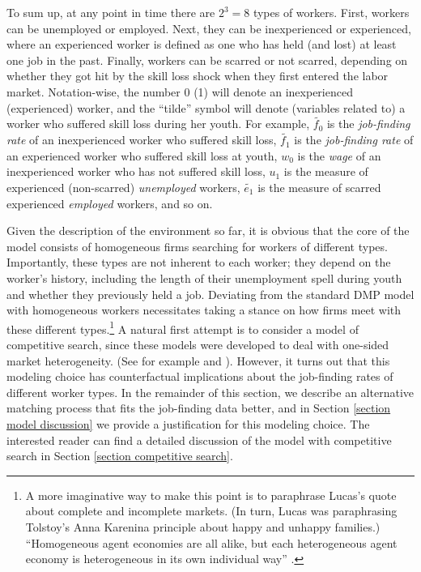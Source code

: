 \documentclass[12pt]{article} %
\theoremstyle{definition}
\begin{document}
To sum up, at any point in time there are $2^3=8$ types of workers. First, workers can be unemployed or employed. Next, they can be inexperienced or experienced, where an experienced worker is defined as one who has held (and lost) at least one job in the past. Finally, workers can be scarred or not scarred, depending on whether they got hit by the skill loss shock when they first entered the labor market. Notation-wise, the number 0 (1) will denote an inexperienced (experienced) worker, and the ``tilde'' symbol will denote (variables related to) a worker who suffered skill loss during her youth. %
For example, $\tilde{f_0}$ is the \textit{job-finding rate} of an inexperienced worker who suffered skill loss, $\tilde{f_1}$ is the  \textit{job-finding rate} of an experienced worker who suffered skill loss at youth, $w_0$ is the  \textit{wage} of an inexperienced worker who has not suffered skill loss, $u_1$ is the measure of experienced (non-scarred)  \textit{unemployed} workers, $\tilde{e_1}$ is the measure of scarred experienced  \textit{employed} workers, and so on.

Given the description of the environment so far, it is obvious that the core of the model consists of homogeneous firms searching for workers of different types.
Importantly, these types are not inherent to each worker; they depend on the worker's history, including the length of their unemployment spell during youth and whether they previously held a job.
Deviating from the standard DMP model with homogeneous workers necessitates taking a stance on how firms meet with these different types.\footnote{\;A more imaginative way to make this point is to paraphrase Lucas's quote about complete and incomplete markets. (In turn, Lucas was paraphrasing Tolstoy's Anna Karenina principle about happy and unhappy families.) ``Homogeneous agent economies are all alike, but each heterogeneous agent economy is heterogeneous in its own individual way'' \citep{lucas1989effects}.}
A natural first attempt is to consider a model of competitive search, since these models were developed to deal with one-sided market heterogeneity. (See for example \citealt{montgomery1991equilibrium} and \citealt{rogerson2005search}). However, it turns out that this modeling choice has counterfactual implications about the job-finding rates of different worker types.
In the remainder of this section, we describe an alternative matching process that fits the job-finding data better, and in Section \ref{section model discussion} we provide a justification for this modeling choice.
The interested reader can find a detailed discussion of the model with competitive search in Section \ref{section competitive search}.
\end{document}
